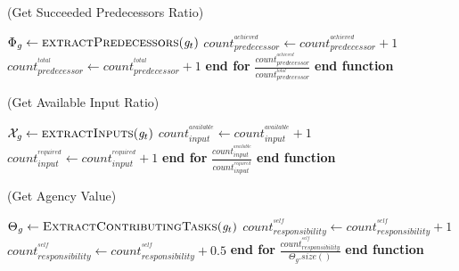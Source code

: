 \documentclass{article}
\begin{document}
\pagebreak
	
\begin{algorithm}
	\caption{(Get Succeeded Predecessors Ratio)}
	\label{array-sum}
	\begin{algorithmic}[1]
			\Statex
			\State $\Phi_{\mathit{g}} \gets
			\Call{extractPredecessors}{\mathit{g}_t}$
			\Statex
					\State $count_{predecessor}^{^{achieved}} \gets
					count_{predecessor}^{^{achieved}} + 1$
				\EndIf
				\Statex
				\State $count_{predecessor}^{^{total}} \gets count_{predecessor}^{^{total}} + 1$
			\EndFor \State \textbf{end for}
			\Statex
			\State \Return
			$\frac{count_{predecessor}^{^{achieved}}}{count_{predecessor}^{^{total}}}$
		\EndFunction 
	\State \textbf{end function}
	\end{algorithmic}
\end{algorithm}

\begin{algorithm}
	\caption{(Get Available Input Ratio)}
	\label{array-sum}
	\begin{algorithmic}[1]
			\Statex
			\State $\mathcal{X}_{\mathit{g}} \gets
			\Call{extractInputs}{\mathit{g}_t}$
			\Statex
					\State $count_{input}^{^{available}} \gets count_{input}^{^{available}} + 1$
				\EndIf
				\Statex
				\State $count_{input}^{^{required}} \gets count_{input}^{^{required}} + 1$
			\EndFor \State \textbf{end for}
			\Statex
			\State \Return
			$\frac{count_{input}^{^{available}}}{count_{input}^{^{required}}}$
		\EndFunction 
	\State \textbf{end function}
	\end{algorithmic}
\end{algorithm}

\begin{algorithm}
	\caption{(Get Agency Value)}
	\label{array-sum}
	\begin{algorithmic}[1]
			\Statex
			\State $\Theta_{\mathit{g}} \gets
			\Call{ExtractContributingTasks}{\mathit{g}_t}$
			\Statex
					\State $count_{responsibility}^{^{self}} \gets count_{responsibility}^{^{self}} + 1$
				\Statex
					\State $count_{responsibility}^{^{self}} \gets
				count_{responsibility}^{^{self}} + 0.5$
				\EndIf
			\EndFor \State \textbf{end for}
			\Statex
			\State \Return 
			$\frac{count_{responsibility}^{^{self}}}{{\Theta_{\mathit{g}}}.size()}$
		\EndFunction 
	\State \textbf{end function}
	\end{algorithmic}
\end{algorithm}
\end{document}

